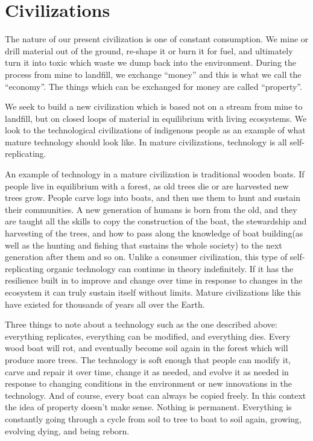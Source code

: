 \section{Civilizations}\label{civilizations}

The nature of our present civilization is one of constant consumption.
We mine or drill material out of the ground, re-shape it or burn it for
fuel, and ultimately turn it into toxic which waste we dump back into
the environment. During the process from mine to landfill, we exchange
``money'' and this is what we call the ``economy''. The things which can
be exchanged for money are called ``property''.

We seek to build a new civilization which is based not on a stream from
mine to landfill, but on closed loops of material in equilibrium with
living ecosystems. We look to the technological civilizations of
indigenous people as an example of what mature technology should look
like. In mature civilizations, technology is all self-replicating.

An example of technology in a mature civilization is traditional wooden
boats. If people live in equilibrium with a forest, as old trees die or
are harvested new trees grow. People carve logs into boats, and then use
them to hunt and sustain their communities. A new generation of humans
is born from the old, and they are taught all the skills to copy the
construction of the boat, the stewardship and harvesting of the trees,
and how to pass along the knowledge of boat building(as well as the
hunting and fishing that sustains the whole society) to the next
generation after them and so on. Unlike a consumer civilization, this
type of self-replicating organic technology can continue in theory
indefinitely. If it has the resilience built in to improve and change
over time in response to changes in the ecosystem it can truly sustain
itself without limits. Mature civilizations like this have existed for
thousands of years all over the Earth.

Three things to note about a technology such as the one described above:
everything replicates, everything can be modified, and everything dies.
Every wood boat will rot, and eventually become soil again in the forest
which will produce more trees. The technology is soft enough that people
can modify it, carve and repair it over time, change it as needed, and
evolve it as needed in response to changing conditions in the
environment or new innovations in the technology. And of course, every
boat can always be copied freely. In this context the idea of property
doesn't make sense. Nothing is permanent. Everything is constantly going
through a cycle from soil to tree to boat to soil again, growing,
evolving dying, and being reborn.

